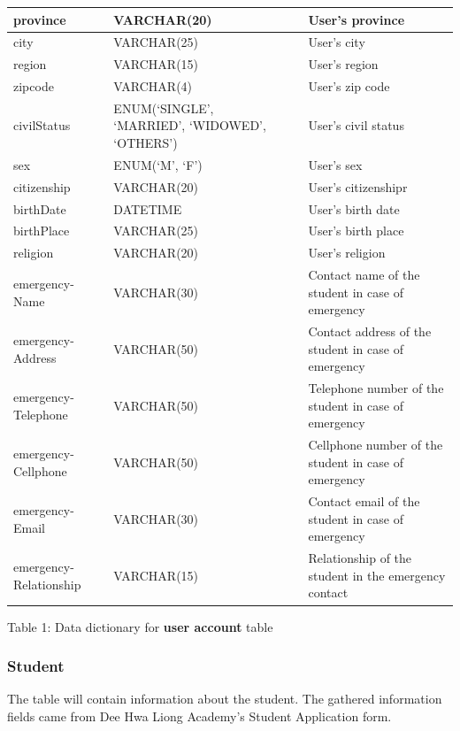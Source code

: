 \documentclass[11pt,a4paper,titlepage]{article}
\begin{document}
\begin{longtable}{ |p{2.5cm}|p{4.5cm}|p{2.5cm}|p{3cm}|  }
    province & VARCHAR(20) & & User's province \\ \hline
    city & VARCHAR(25) & & User's city \\ \hline
    region & VARCHAR(15) & & User's region \\ \hline
    zipcode & VARCHAR(4) & & User's zip code \\ \hline
    civilStatus & ENUM(`SINGLE', `MARRIED', `WIDOWED', `OTHERS') & & User's civil status \\ \hline
    sex & ENUM(`M', `F') & & User's sex \\ \hline
    citizenship & VARCHAR(20) & & User's citizenshipr \\ \hline
    birthDate & DATETIME & & User's birth date \\ \hline
    birthPlace & VARCHAR(25) & & User's birth place \\ \hline
    religion & VARCHAR(20) & & User's religion \\ \hline
    emergency- Name & VARCHAR(30) & & Contact name of the student in case of emergency \\ \hline
    emergency- Address & VARCHAR(50) & & Contact address of the student in case of emergency \\ \hline
    emergency- Telephone & VARCHAR(50) & & Telephone number of the student in case of emergency \\ \hline
    emergency- Cellphone & VARCHAR(50) & & Cellphone number of the student in case of emergency \\ \hline
    emergency- Email & VARCHAR(30) & & Contact email of the student in case of emergency \\ \hline
    emergency- Relationship & VARCHAR(15) & & Relationship of the student in the emergency contact \\ \hline
\end{longtable}

\vspace{1cm}
\begin{center}
Table 1: Data dictionary for \textbf{user account} table
\end{center}
\newpage
\subsubsection{Student}

The table will contain information about the student. The gathered information fields came from Dee Hwa Liong Academy's Student Application form.
\end{document}
